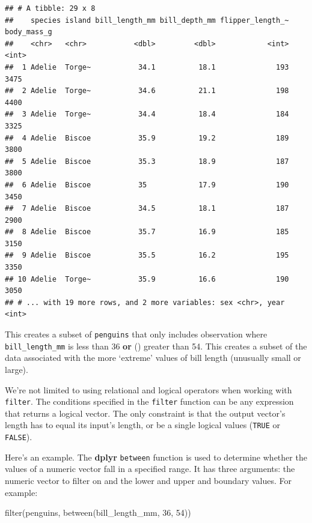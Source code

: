 \documentclass[
]{book}
\newenvironment{Shaded}{\begin{snugshade}}{\end{snugshade}}
\newcommand{\DecValTok}[1]{\textcolor[rgb]{0.00,0.00,0.81}{#1}}
\newcommand{\FunctionTok}[1]{\textcolor[rgb]{0.00,0.00,0.00}{#1}}
\newcommand{\NormalTok}[1]{#1}
\begin{document}
\begin{verbatim}
## # A tibble: 29 x 8
##    species island bill_length_mm bill_depth_mm flipper_length_~ body_mass_g
##    <chr>   <chr>           <dbl>         <dbl>            <int>       <int>
##  1 Adelie  Torge~           34.1          18.1              193        3475
##  2 Adelie  Torge~           34.6          21.1              198        4400
##  3 Adelie  Torge~           34.4          18.4              184        3325
##  4 Adelie  Biscoe           35.9          19.2              189        3800
##  5 Adelie  Biscoe           35.3          18.9              187        3800
##  6 Adelie  Biscoe           35            17.9              190        3450
##  7 Adelie  Biscoe           34.5          18.1              187        2900
##  8 Adelie  Biscoe           35.7          16.9              185        3150
##  9 Adelie  Biscoe           35.5          16.2              195        3350
## 10 Adelie  Torge~           35.9          16.6              190        3050
## # ... with 19 more rows, and 2 more variables: sex <chr>, year <int>
\end{verbatim}

This creates a subset of \texttt{penguins} that only includes observation where \texttt{bill\_length\_mm} is less than 36 \textbf{or} (\texttt{\textbar{}}) greater than 54. This creates a subset of the data associated with the more `extreme' values of bill length (unusually small or large).

We're not limited to using relational and logical operators when working with \texttt{filter}. The conditions specified in the \texttt{filter} function can be any expression that returns a logical vector. The only constraint is that the output vector's length has to equal its input's length, or be a single logical values (\texttt{TRUE} or \texttt{FALSE}).

Here's an example. The \textbf{dplyr} \texttt{between} function is used to determine whether the values of a numeric vector fall in a specified range. It has three arguments: the numeric vector to filter on and the lower and upper and boundary values. For example:

\begin{Shaded}
\begin{Highlighting}[]
\FunctionTok{filter}\NormalTok{(penguins, }\FunctionTok{between}\NormalTok{(bill\_length\_mm, }\DecValTok{36}\NormalTok{, }\DecValTok{54}\NormalTok{))}
\end{Highlighting}
\end{Shaded}
\end{document}
